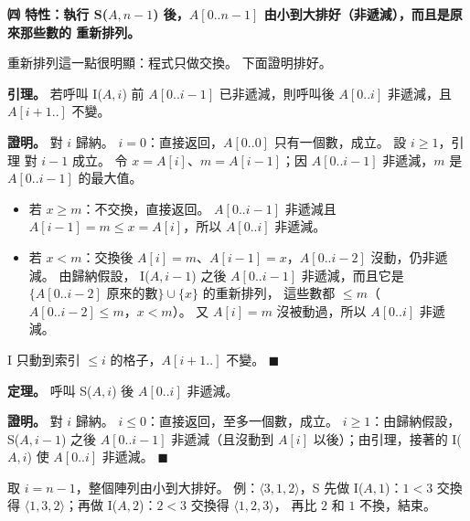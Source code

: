 \begin{pastsoln}
\textbf{㈣ 特性：執行 S($A, n-1$) 後，$A[0..n-1]$ 由小到大排好（非遞減），而且是原來那些數的
重新排列。}

重新排列這一點很明顯：程式只做交換。 下面證明排好。

\textbf{引理。} 若呼叫 I($A, i$) 前 $A[0..i-1]$ 已非遞減，則呼叫後 $A[0..i]$ 非遞減，且 $A[i+1..]$
不變。

\textbf{證明。} 對 $i$ 歸納。 $i = 0$：直接返回，$A[0..0]$ 只有一個數，成立。 設 $i \ge 1$，引理
對 $i - 1$ 成立。 令 $x = A[i]$、$m = A[i-1]$；因 $A[0..i-1]$ 非遞減，$m$ 是 $A[0..i-1]$ 的最大值。
\begin{itemize}[nosep]
\item 若 $x \ge m$：不交換，直接返回。 $A[0..i-1]$ 非遞減且 $A[i-1] = m \le x = A[i]$，所以
$A[0..i]$ 非遞減。
\item 若 $x < m$：交換後 $A[i] = m$、$A[i-1] = x$，$A[0..i-2]$ 沒動，仍非遞減。 由歸納假設，
I($A, i-1$) 之後 $A[0..i-1]$ 非遞減，而且它是 $\{A[0..i-2]$ 原來的數$\} \cup \{x\}$ 的重新排列，
這些數都 $\le m$（$A[0..i-2] \le m$，$x < m$）。 又 $A[i] = m$ 沒被動過，所以 $A[0..i]$ 非遞減。
\end{itemize}
I 只動到索引 $\le i$ 的格子，$A[i+1..]$ 不變。 \hfill$\blacksquare$

\textbf{定理。} 呼叫 S($A, i$) 後 $A[0..i]$ 非遞減。

\textbf{證明。} 對 $i$ 歸納。 $i \le 0$：直接返回，至多一個數，成立。 $i \ge 1$：由歸納假設，
S($A, i-1$) 之後 $A[0..i-1]$ 非遞減（且沒動到 $A[i]$ 以後）；由引理，接著的 I($A, i$) 使
$A[0..i]$ 非遞減。 \hfill$\blacksquare$

取 $i = n - 1$，整個陣列由小到大排好。 例：$\langle 3, 1, 2 \rangle$，S 先做 I($A, 1$)：$1 < 3$
交換得 $\langle 1, 3, 2 \rangle$；再做 I($A, 2$)：$2 < 3$ 交換得 $\langle 1, 2, 3 \rangle$，
再比 $2$ 和 $1$ 不換，結束。
\end{pastsoln}
